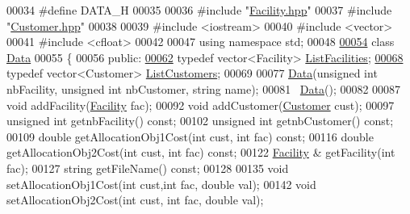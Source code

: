 \begin{DoxyCode}
00034 \textcolor{preprocessor}{}\textcolor{preprocessor}{#define DATA\_H}
00035 \textcolor{preprocessor}{}
00036 \textcolor{preprocessor}{#include "\hyperlink{Facility_8hpp}{Facility.hpp}"}
00037 \textcolor{preprocessor}{#include "\hyperlink{Customer_8hpp}{Customer.hpp}"}
00038 
00039 \textcolor{preprocessor}{#include <iostream>}
00040 \textcolor{preprocessor}{#include <vector>}
00041 \textcolor{preprocessor}{#include <cfloat>}
00042 
00047 \textcolor{keyword}{using namespace }std;
00048 
\hypertarget{Data_8hpp_source_l00054}{}\hyperlink{classData}{00054} \textcolor{keyword}{class }\hyperlink{classData}{Data}
00055 \{
00056 \textcolor{keyword}{public}:
\hypertarget{Data_8hpp_source_l00062}{}\hyperlink{classData_a63d34805405ed1b64c868cd5ef7267ef}{00062}     \textcolor{keyword}{typedef} vector<Facility> \hyperlink{classData_a63d34805405ed1b64c868cd5ef7267ef}{ListFacilities};
\hypertarget{Data_8hpp_source_l00068}{}\hyperlink{classData_a3252caf2ec3ffeb972647e9e2f005bea}{00068}     \textcolor{keyword}{typedef} vector<Customer> \hyperlink{classData_a3252caf2ec3ffeb972647e9e2f005bea}{ListCustomers};
00069     
00077     \hyperlink{classData}{Data}(\textcolor{keywordtype}{unsigned} \textcolor{keywordtype}{int} nbFacility, \textcolor{keywordtype}{unsigned} \textcolor{keywordtype}{int} nbCustomer, \textcolor{keywordtype}{string} name);
00081     ~\hyperlink{classData}{Data}();
00082     
00087     \textcolor{keywordtype}{void} addFacility(\hyperlink{classFacility}{Facility} fac);
00092     \textcolor{keywordtype}{void} addCustomer(\hyperlink{classCustomer}{Customer} cust);
00097     \textcolor{keywordtype}{unsigned} \textcolor{keywordtype}{int} getnbFacility() \textcolor{keyword}{const};
00102     \textcolor{keywordtype}{unsigned} \textcolor{keywordtype}{int} getnbCustomer() \textcolor{keyword}{const};
00109     \textcolor{keywordtype}{double} getAllocationObj1Cost(\textcolor{keywordtype}{int} cust, \textcolor{keywordtype}{int} fac) \textcolor{keyword}{const};
00116     \textcolor{keywordtype}{double} getAllocationObj2Cost(\textcolor{keywordtype}{int} cust, \textcolor{keywordtype}{int} fac) \textcolor{keyword}{const};
00122     \hyperlink{classFacility}{Facility} & getFacility(\textcolor{keywordtype}{int} fac);
00127     \textcolor{keywordtype}{string} getFileName() \textcolor{keyword}{const};
00128     
00135     \textcolor{keywordtype}{void} setAllocationObj1Cost(\textcolor{keywordtype}{int} cust,\textcolor{keywordtype}{int} fac, \textcolor{keywordtype}{double} val);
00142     \textcolor{keywordtype}{void} setAllocationObj2Cost(\textcolor{keywordtype}{int} cust, \textcolor{keywordtype}{int} fac, \textcolor{keywordtype}{double} val);

\end{DoxyCode}
